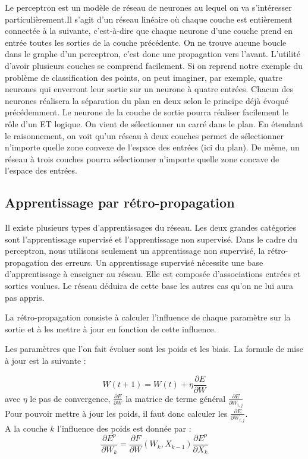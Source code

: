 Le perceptron est un modèle de réseau de neurones au lequel on va s’intéresser particulièrement.Il s'agit d'un réseau linéaire où chaque couche est entièrement connectée à la suivante, c'est-à-dire que chaque neurone d'une couche prend en entrée toutes les sorties de la couche précédente. On ne trouve aucune boucle dans le graphe d'un perceptron, c'est donc une propagation vers l'avant.
L’utilité d’avoir plusieurs couches se comprend facilement. Si on reprend notre exemple du problème de classification des points, on peut imaginer, par exemple, quatre neurones qui enverront leur sortie sur un neurone à quatre entrées. Chacun des neurones réalisera la séparation du plan en deux selon le principe déjà évoqué précédemment. Le neurone de la couche de sortie pourra réaliser facilement le rôle d’un ET logique. On vient de sélectionner un carré dans le plan. En étendant le raisonnement, on voit qu’un réseau à deux couches permet de sélectionner n’importe quelle zone convexe de l’espace des entrées (ici du plan). De même, un réseau à trois couches pourra sélectionner n’importe quelle zone concave de l’espace des entrées.\\






\subsection{Apprentissage par rétro-propagation}

Il existe plusieurs types d'apprentissages du réseau. Les deux grandes catégories sont l'apprentissage supervisé et l'apprentissage non supervisé. 
Dans le cadre du perceptron, nous utilisons seulement un apprentissage non supervisé, la rétro-propagation des erreurs. Un apprentissage supervisé nécessite une base d'apprentissage à enseigner au réseau. Elle est composée d'associations entrées et sorties voulues. Le réseau déduira de cette base les autres cas qu'on ne lui aura pas appris. 

La rétro-propagation consiste à calculer l’influence de chaque paramètre sur la sortie et à les mettre à jour en fonction de cette influence.

Les paramètres que l’on fait évoluer sont les poids et les biais.
La formule de mise à jour est la suivante :

\[
W(t+1) = W(t) + \eta \frac{\partial E}{\partial W} 
\]
avec $\eta$ le pas de convergence, $\frac{\partial E}{\partial W} $ la matrice de terme général $\frac{\partial E}{\partial W_{i,j}} $\\
Pour pouvoir mettre à jour les poids, il faut donc calculer les $\frac{\partial E}{\partial W_{i,j}} $.\\
A la couche $k$ l'influence des poids est donnée par : 
\[
	\frac{\partial E^p}{\partial W _k} = \frac{\partial F}{\partial W}(W_k, X_{k-1})\frac{\partial E^p}{\partial X_k}
\]

